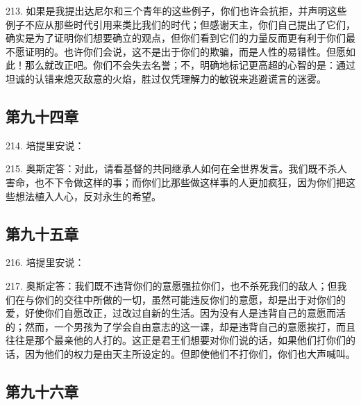 213. 如果是我提出达尼尔和三个青年的这些例子，你们也许会抗拒，并声明这些例子不应从那些时代引用来类比我们的时代；但感谢天主，你们自己提出了它们，确实是为了证明你们想要确立的观点，但你们看到它们的力量反而更有利于你们最不愿证明的。也许你们会说，这不是出于你们的欺骗，而是人性的易错性。但愿如此！那么就改正吧。你们不会失去名誉；不，明确地标记更高超的心智的是：通过坦诚的认错来熄灭敌意的火焰，胜过仅凭理解力的敏锐来逃避谎言的迷雾。\par


\subsection{第九十四章}

214. 培提里安说：\par

215. 奥斯定答：对此，请看基督的共同继承人如何在全世界发言。我们既不杀人害命，也不下令做这样的事；而你们比那些做这样事的人更加疯狂，因为你们把这些想法植入人心，反对永生的希望。\par


\subsection{第九十五章}

216. 培提里安说：\par

217. 奥斯定答：我们既不违背你们的意愿强拉你们，也不杀死我们的敌人；但我们在与你们的交往中所做的一切，虽然可能违反你们的意愿，却是出于对你们的爱，好使你们自愿改正，过改过自新的生活。因为没有人是违背自己的意愿而活的；然而，一个男孩为了学会自由意志的这一课，却是违背自己的意愿挨打，而且往往是那个最亲他的人打的。这正是君王们想要对你们说的话，如果他们打你们的话，因为他们的权力是由天主所设定的。但即使他们不打你们，你们也大声喊叫。\par


\subsection{第九十六章}

